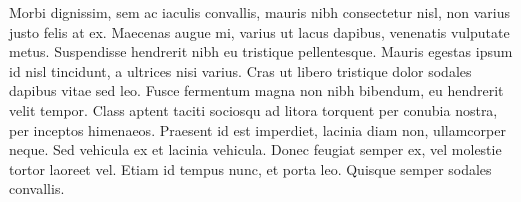 Morbi dignissim, sem ac iaculis convallis, mauris nibh consectetur nisl, non varius justo felis at ex. Maecenas augue mi, varius ut lacus dapibus, venenatis vulputate metus. Suspendisse hendrerit nibh eu tristique pellentesque. Mauris egestas ipsum id nisl tincidunt, a ultrices nisi varius. Cras ut libero tristique dolor sodales dapibus vitae sed leo. Fusce fermentum magna non nibh bibendum, eu hendrerit velit tempor. Class aptent taciti sociosqu ad litora torquent per conubia nostra, per inceptos himenaeos. Praesent id est imperdiet, lacinia diam non, ullamcorper neque. Sed vehicula ex et lacinia vehicula. Donec feugiat semper ex, vel molestie tortor laoreet vel. Etiam id tempus nunc, et porta leo. Quisque semper sodales convallis.
